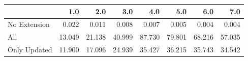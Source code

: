 \begin{tabular}{lrrrrrrr}
\toprule
{} &    1.0 &    2.0 &    3.0 &    4.0 &    5.0 &    6.0 &    7.0 \\
\midrule
No Extension &  0.022 &  0.011 &  0.008 &  0.007 &  0.005 &  0.004 &  0.004 \\
All          & 13.049 & 21.138 & 40.999 & 87.730 & 79.801 & 68.216 & 57.035 \\
Only Updated & 11.900 & 17.096 & 24.939 & 35.427 & 36.215 & 35.743 & 34.542 \\
\bottomrule
\end{tabular}
